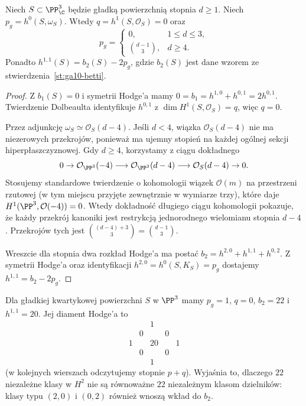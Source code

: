 \begin{stwierdzenie}
\label{st:ga10-hodge-hypersurf}
Niech $S\subset\PP^3_\C$ będzie gładką powierzchnią
stopnia $d\ge1$. Niech $p_g=h^0(S,\omega_S)$.
Wtedy $q=h^1(S,\mathcal O_S)=0$ oraz
\[
 p_g=\begin{cases}0,&1\le d\le3,\\
 \binom{d-1}{3},&d\ge4.\end{cases}
\]
Ponadto $h^{1,1}(S)=b_2(S)-2p_g$, gdzie
$b_2(S)$ jest dane wzorem ze
stwierdzenia~\ref{st:ga10-betti}.
\end{stwierdzenie}
\begin{proof}
Z $b_1(S)=0$ i symetrii Hodge'a mamy
$0=b_1=h^{1,0}+h^{0,1}=2h^{0,1}$.
Twierdzenie Dolbeaulta identyfikuje
$h^{0,1}$ z $\dim H^1(S,\mathcal O_S)=q$,
więc $q=0$.

Przez adjunkcję $\omega_S\simeq\mathcal O_S(d-4)$.
Jeśli $d<4$, wiązka $\mathcal O_S(d-4)$ nie ma
niezerowych przekrojów, ponieważ ma ujemny stopień
na każdej ogólnej sekcji hiperpłaszczyznowej.
Gdy $d\ge4$, korzystamy z ciągu dokładnego
\[
 0\to\mathcal O_{\PP^3}(-4)\longrightarrow
 \mathcal O_{\PP^3}(d-4)\longrightarrow
 \mathcal O_S(d-4)\to0.
\]
Stosujemy standardowe twierdzenie o kohomologii wiązek
$\mathcal O(m)$ na przestrzeni rzutowej (w tym miejscu
przyjęte zewnętrznie w wymiarze trzy), które daje
$H^1(\PP^3,\mathcal O(-4))=0$. Wtedy dokładność
długiego ciągu kohomologii pokazuje, że każdy przekrój
kanoniki jest restrykcją jednorodnego wielomianu
stopnia $d-4$. Przekrojów tych jest
$\binom{(d-4)+3}{3}=\binom{d-1}{3}$.

Wreszcie dla stopnia dwa rozkład Hodge'a ma postać
$b_2=h^{2,0}+h^{1,1}+h^{0,2}$.
Z symetrii Hodge'a oraz identyfikacji
$h^{2,0}=h^0(S,K_S)=p_g$ dostajemy
$h^{1,1}=b_2-2p_g$.
\end{proof}

\begin{przyklad}[Diament K3]
Dla gładkiej kwartykowej powierzchni $S$ w $\PP^3$
mamy $p_g=1$, $q=0$, $b_2=22$ i $h^{1,1}=20$.
Jej diament Hodge'a to
\[
 \begin{array}{ccccc}
 &&1&&\\
 &0&&0&\\
 1&&20&&1\\
 &0&&0&\\
 &&1&&
 \end{array}
\]
(w kolejnych wierszach odczytujemy stopnie $p+q$).
Wyjaśnia to, dlaczego $22$ niezależne klasy w $H^2$
nie są równoważne $22$ niezależnym klasom dzielników:
klasy typu $(2,0)$ i $(0,2)$ również wnoszą wkład do $b_2$.
\end{przyklad}

